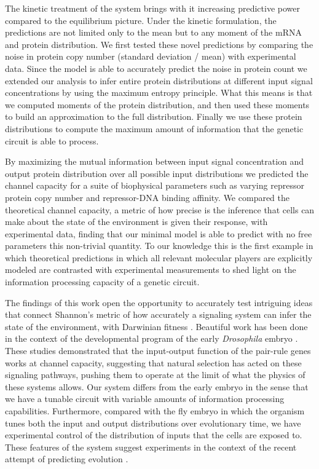 The kinetic treatment of the system brings with it increasing predictive power
compared to the equilibrium picture. Under the kinetic formulation, the
predictions are not limited only to the mean but to any moment of the mRNA and
protein distribution. We first tested these novel predictions by comparing the
noise in protein copy number (standard deviation / mean) with experimental data.
Since the model is able to accurately predict the noise in protein count we
extended our analysis to infer entire protein distributions at different input
signal concentrations by using the maximum entropy principle. What this means is
that we computed moments of the protein distribution, and then used these
moments to build an approximation to the full distribution. Finally we use these
protein distributions to compute the maximum amount of information that the
genetic circuit is able to process.

By maximizing the mutual information between input signal concentration and
output protein distribution over all possible input distributions we predicted
the channel capacity for a suite of biophysical parameters such as varying
repressor protein copy number and repressor-DNA binding affinity. We compared
the theoretical channel capacity, a metric of how precise is the inference that
cells can make about the state of the environment is given their response, with
experimental data, finding that our minimal model is able to predict with no
free parameters this non-trivial quantity. To our knowledge this is the first
example in which theoretical predictions in which all relevant molecular players
are explicitly modeled are contrasted with experimental measurements to shed
light on the information processing capacity of a genetic circuit.

The findings of this work open the opportunity to accurately test intriguing
ideas that connect Shannon's metric of how accurately a signaling system can
infer the state of the environment, with Darwinian fitness \cite{Taylor2007a}.
Beautiful work has been done in the context of the developmental program of the
early {\it Drosophila} embryo \cite{Tkacik2008, Petkova2016}. These studies
demonstrated that the input-output function of the pair-rule genes works at
channel capacity, suggesting that natural selection has acted on these signaling
pathways, pushing them to operate at the limit of what the physics of these
systems allows. Our system differs from the early embryo in the sense that we
have a tunable circuit with variable amounts of information processing
capabilities. Furthermore, compared with the fly embryo in which the organism
tunes both the input and output distributions over evolutionary time, we have
experimental control of the distribution of inputs that the cells are exposed
to. These features of the system suggest experiments in the context of the
recent attempt of predicting evolution \cite{Lassig2017}.

